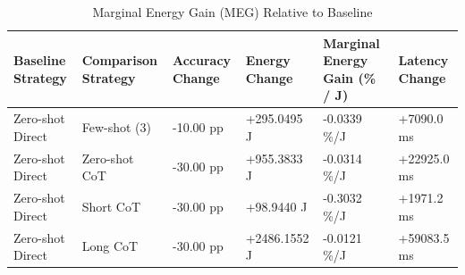 \begin{table}
\caption{Marginal Energy Gain (MEG) Relative to Baseline}
\label{tab:marginal_energy_gain}
\begin{tabular}{llllll}
\toprule
Baseline Strategy & Comparison Strategy & Accuracy Change & Energy Change & Marginal Energy Gain (\% / J) & Latency Change \\
\midrule
Zero-shot Direct & Few-shot (3) & -10.00 pp & +295.0495 J & -0.0339 \%/J & +7090.0 ms \\
Zero-shot Direct & Zero-shot CoT & -30.00 pp & +955.3833 J & -0.0314 \%/J & +22925.0 ms \\
Zero-shot Direct & Short CoT & -30.00 pp & +98.9440 J & -0.3032 \%/J & +1971.2 ms \\
Zero-shot Direct & Long CoT & -30.00 pp & +2486.1552 J & -0.0121 \%/J & +59083.5 ms \\
\bottomrule
\end{tabular}
\end{table}
